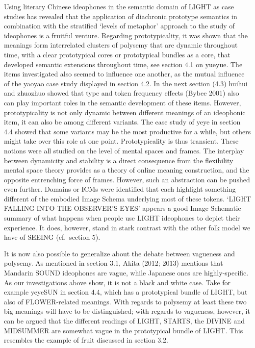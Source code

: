 Using literary Chinese ideophones in the semantic domain of LIGHT as
case studies has revealed that the application of diachronic prototype
semantics in combination with the stratified `levels of metaphor'
approach to the study of ideophones is a fruitful venture. Regarding
prototypicality, it was shown that the meanings form interrelated
clusters of polysemy that are dynamic throughout time, with a clear
prototypical cores or prototypical bundles as a core, that developed
semantic extensions throughout time, see section 4.1 on yueyue. The
items investigated also seemed to influence one another, as the mutual
influence of the yaoyao case study displayed in section 4.2. In the next
section (4.3) huihui and zhuozhuo showed that type and token frequency
effects (Bybee 2001) also can play important roles in the semantic
development of these items. However, prototypicality is not only dynamic
between different meanings of an ideophonic item, it can also be among
different variants. The case study of yeye in section 4.4 showed that
some variants may be the most productive for a while, but others might
take over this role at one point. Prototypicality is thus transient.
These notions were all studied on the level of mental spaces and frames.
The interplay between dynamicity and stability is a direct consequence
from the flexibility mental space theory provides as a theory of online
meaning construction, and the opposite entrenching force of frames.
However, such an abstraction can be pushed even further. Domains or ICMs
were identified that each highlight something different of the embodied
Image Schema underlying most of these tokens. `LIGHT FALLING INTO THE
OBSERVER'S EYES' appears a good Image Schematic summary of what happens
when people use LIGHT ideophones to depict their experience. It does,
however, stand in stark contrast with the other folk model we have of
SEEING (cf.~section 5).

It is now also possible to generalize about the debate between vagueness
and polysemy. As mentioned in section 3.1, Akita (2012; 2013) mentions
that Mandarin SOUND ideophones are vague, while Japanese ones are
highly-specific. As our investigations above show, it is not a black and
white case. Take for example yeyeSUN in section 4.4, which has a
prototypical bundle of LIGHT, but also of FLOWER-related meanings. With
regards to polysemy at least these two big meanings will have to be
distinguished; with regards to vagueness, however, it can be argued that
the different readings of LIGHT, STARTS, the DIVINE and MIDSUMMER are
somewhat vague in the prototypical bundle of LIGHT. This resembles the
example of fruit discussed in section 3.2.

